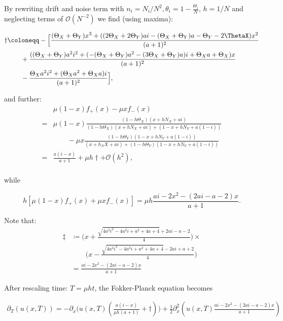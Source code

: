 By rewriting drift and noise term with $n_i = N_i/N^2, \theta_i = 1- \frac{\Theta_i}{N}$, $h = 1/N$ and neglecting terms of $\mathcal{O}(N^{-2})$ we find (using maxima):

\begin{align*}
	\dagger &\coloneqq -\Big[\frac{(\Theta_X + \Theta_Y)x^3 + ((2\Theta_X + 2\Theta_Y)ai -(\Theta_X + \Theta_Y)a - \Theta_Y - 2\ThetaX)x^2}{(a+1)^2}\Big.\\
	&\qquad + \Big.\frac{((\Theta_X + \Theta_Y)a^2 i^2 + (- (\Theta_X + \Theta_Y)a^2 -(3\Theta_X + \Theta_Y)a)i + \Theta_X a + \Theta_X)x}{(a+1)^2}\Big.\\
	&\qquad - \Big.\frac{\Theta_X a^2 i^2 + (\Theta_X a^2 + \Theta_X a)i}{(a+1)^2}\Big],\\
\end{align*}

and further: 
\begin{align*}
	& \mu(1-x)f_+(x) - \mu xf_-(x)\\
	= & \mu(1-x) \frac{(1-h\Theta_X) (x+ hN_X+ ai)}{(1-h\Theta_X) (x + hN_X + ai) + (1-x + hN_Y + a(1-i))}\\
	&\qquad - \mu x \frac{(1-h\Theta_Y)(1-x+hN_Y+a(1-i))}{(x+h_NX+ai) + (1-h\Theta_Y)(1-x+hN_Y+a(1-i))}\\
	=& \frac{a(i-x)}{a+1} + \mu h \dagger + \mathcal{O}(h^2),\\
\end{align*}

while 

\begin{equation*}
h\left[\mu(1-x)f_+(x) + \mu xf_-(x)\right] = \mu h \frac{ai - 2x^2 - (2ai - a -2)x}{a+1}.
\end{equation*}

Note that:
\begin{align*}
	\ddagger &\coloneqq \Big(x+\frac{\sqrt{4a^2i^2-4a^2i+a^2+4a+4}+2ai-a-2}{4}\Big) \times\\
	&\qquad \Big(x-\frac{\sqrt{4a^2i^2-4a^2i+a^2+4a+4}-2ai+a+2}{4}\Big)\\
	&=\frac{ai - 2x^2 - (2ai - a -2)x}{a+1}
\end{align*}


After rescaling time: $T = \mu h t$, the Fokker-Planck equation becomes

\begin{align*}
	\partial_T \left(u\left(x, T\right)\right) = -\partial_x\big(u(x,T)\left(\frac{a(i-x)}{\mu h(a+1)} + \dagger \right)\big) + \frac{1}{2} \partial^2_x\left(u(x,T)\frac{ai - 2x^2 - (2ai - a -2)x}{a+1}\right)
\end{align*}

